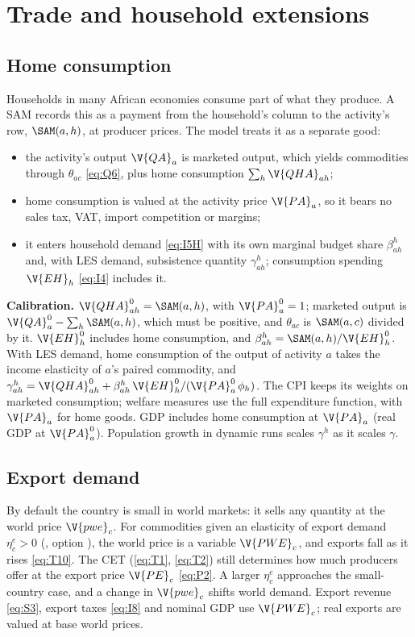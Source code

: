 \chapter{Trade and household extensions}\label{chap:trade}

\section{Home consumption}\label{sec:home}

Households in many African economies consume part of what they produce. A SAM
records this as a payment from the household's column to the activity's row,
$\SAM(a, h)$, at producer prices. The model treats it as a separate good:
\begin{itemize}
\item the activity's output $\V{QA}_a$ is marketed output, which yields
commodities through $\theta_{ac}$ \eqref{eq:Q6}, plus home consumption
$\sum_h \V{QHA}_{ah}$;
\item home consumption is valued at the activity price $\V{PA}_a$, so it bears
no sales tax, VAT, import competition or margins;
\item it enters household demand \eqref{eq:I5H} with its own marginal budget
share $\beta^h_{ah}$ and, with LES demand, subsistence quantity
$\gamma^h_{ah}$; consumption spending $\V{EH}_h$ \eqref{eq:I4} includes it.
\end{itemize}

\textbf{Calibration.} $\V{QHA}^0_{ah} = \SAM(a, h)$, with $\V{PA}^0_a = 1$;
marketed output is $\V{QA}^0_a - \sum_h \SAM(a, h)$, which must be positive,
and $\theta_{ac}$ is $\SAM(a, c)$ divided by it. $\V{EH}^0_h$ includes home
consumption, and $\beta^h_{ah} = \SAM(a, h) / \V{EH}^0_h$. With LES demand,
home consumption of the output of activity $a$ takes the income elasticity of
$a$'s paired commodity, and
$\gamma^h_{ah} = \V{QHA}^0_{ah} + \beta^h_{ah}\,\V{EH}^0_h / (\V{PA}^0_a\,\phi_h)$.
The CPI keeps its weights on marketed consumption; welfare measures use the
full expenditure function, with $\V{PA}_a$ for home goods. GDP includes home
consumption at $\V{PA}_a$ (real GDP at $\V{PA}^0_a$). Population growth in
dynamic runs scales $\gamma^h$ as it scales $\gamma$.

\section{Export demand}\label{sec:exportdemand}

By default the country is small in world markets: it sells any quantity at the
world price $\V{pwe}_c$. For commodities given an elasticity of export demand
$\eta^e_c > 0$ (, option ), the world
price is a variable $\V{PWE}_c$, and exports fall as it rises
\eqref{eq:T10}. The CET (\eqref{eq:T1}, \eqref{eq:T2}) still determines how
much producers offer at the export price $\V{PE}_c$ \eqref{eq:P2}. A larger
$\eta^e_c$ approaches the small-country case, and a change in $\V{pwe}_c$
shifts world demand. Export revenue \eqref{eq:S3}, export taxes
\eqref{eq:I8} and nominal GDP use $\V{PWE}_c$; real exports are valued at base
world prices.

